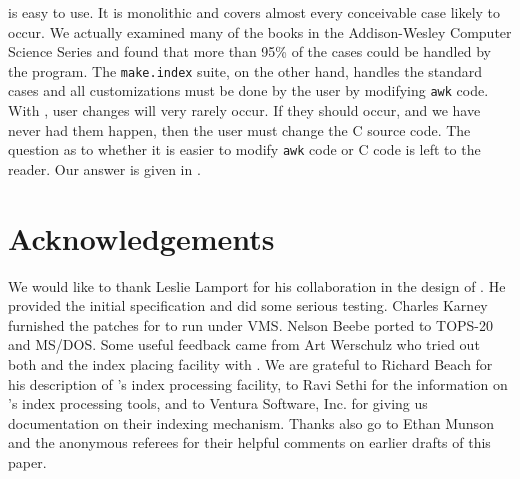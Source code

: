 {\MI} is easy to use.  It is monolithic and covers almost every conceivable
case likely to occur.  We actually examined many of the books in the
Addison-Wesley Computer Science Series and found that more than 95\% of the
cases could be handled by the program.  The \verb|make.index| suite, on the
other hand, handles the standard cases and all customizations must be done
by the user by modifying \verb|awk| code.  With {\MI}, user changes will
very rarely occur.  If they should occur, and we have never had them happen,
then the user must change the C source code.  The question as to whether it is
easier to modify \verb|awk| code or C code is left to the reader.
Our answer is given in {\MI}.


\section{Acknowledgements}
We would like to thank Leslie Lamport for his collaboration in the design
of {\MI}.  He provided the initial specification and did some serious testing.
Charles Karney furnished the patches for {\MI} to run under VMS.
Nelson Beebe ported {\MI} to TOPS-20 and MS/DOS.
Some useful feedback came from Art Werschulz who tried out both {\MI}
and the index placing facility with {\AmSTeX}.
We are grateful to Richard Beach for his description of {\TG}'s
index processing facility, to Ravi Sethi for the information on {\TF}'s
index processing tools, and to Ventura Software, Inc. for giving us
documentation on their indexing mechanism.
Thanks also go to Ethan Munson and the anonymous referees for their helpful
comments on earlier drafts of this paper.

% 
% 

{\small

}

